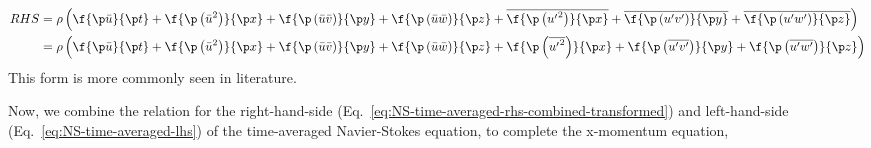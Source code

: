 \begin{equation}
  \begin{aligned}
    RHS &= \rho \left(
    \f{\p \bar{u}}{\p t}
    + \f{\p \left({\bar{u}}^2\right)}{\p x}
    + \f{\p \left(\bar{u}\bar{v}\right)}{\p y}
    + \f{\p \left(\bar{u}\bar{w}\right)}{\p z}
    + \overline{\f{\p \left({{u^\prime}}^2\right)}{\p x}}
    + \overline{\f{\p \left({u^\prime}{v^\prime}\right)}{\p y}}
    + \overline{\f{\p \left({u^\prime}{w^\prime}\right)}{\p z}}
  \right)\\
  &= \rho \left(
    \f{\p \bar{u}}{\p t}
    + \f{\p \left({\bar{u}}^2\right)}{\p x}
    + \f{\p \left(\bar{u}\bar{v}\right)}{\p y}
    + \f{\p \left(\bar{u}\bar{w}\right)}{\p z}
    + \f{\p \left(\overline{{{u^\prime}}^2}\right)}{\p x}
    + \f{\p \left(\overline{{u^\prime}{v^\prime}}\right)}{\p y}
    + \f{\p \left(\overline{{u^\prime}{w^\prime}}\right)}{\p z}
  \right)\\
  \end{aligned}
  \label{eq:NS-time-averaged-rhs-combined-transformed}
\end{equation}
%
This form is more commonly seen in literature.

Now, we combine the relation for the right-hand-side (Eq.~\ref{eq:NS-time-averaged-rhs-combined-transformed}) and left-hand-side (Eq.~\ref{eq:NS-time-averaged-lhs}) of the time-averaged Navier-Stokes equation, to complete the x-momentum equation,

